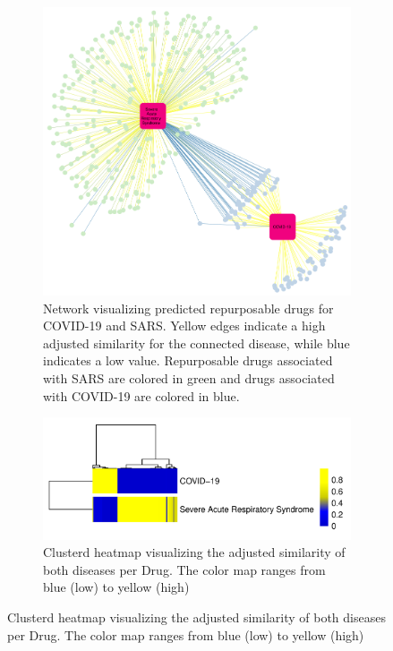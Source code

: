\begin{figure}[H]
     \centering
    \begin{subfigure}{\textwidth}%
        \captionsetup{width=\textwidth}
        \centering
        \includegraphics[width=\textwidth]{figures/COVID19xSARS_network.png}
        \caption{Network visualizing predicted repurposable drugs for COVID-19 and SARS. Yellow edges indicate a high adjusted similarity for the connected disease, while blue indicates a low value. Repurposable drugs associated with SARS are colored in green and drugs associated with COVID-19 are colored in blue.}
        \label{fig:Network}
    \end{subfigure}
     \hfill
     \begin{subfigure}[b]{0.45\textwidth}
         \centering
         \includegraphics[width=\textwidth]{figures/Disease_Drug_Heatmap.png}
         \caption{Clusterd heatmap visualizing the adjusted similarity of both diseases per Drug. The color map ranges from blue (low) to yellow (high)}

\end{subfigure}
\end{figure}

